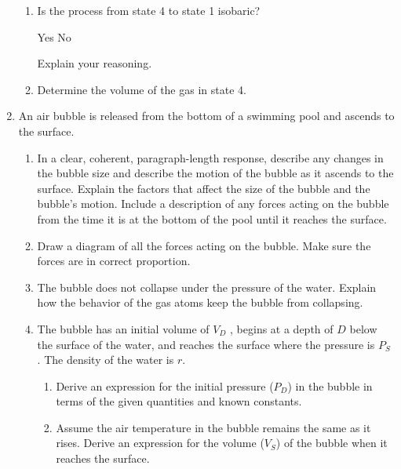 \documentclass{../../../oss-apphys}
\begin{document}
\begin{enumerate}[leftmargin=15pt]
\begin{enumerate}[leftmargin=18pt]
  \item Is the process from state 4 to state 1 isobaric?

    \vspace{.1in}\underline{\hspace{.3in}}Yes\hspace{.5in}
    \underline{\hspace{.3in}} No

    \vspace{.1in}Explain your reasoning.\vspace{.35in}

  \item Determine the volume of the gas in state 4.
    \vspace{1.25in}
  \end{enumerate}
  
\item An air bubble is released from the bottom of a swimming pool and ascends
  to the surface.
  \begin{enumerate}[leftmargin=18pt]
  \item In a clear, coherent, paragraph-length response, describe any
    changes in the bubble size and describe the motion of the bubble
    as it ascends to the surface. Explain the factors that affect the size
    of the bubble and the bubble's motion. Include a description of
    any forces acting on the bubble from the time it is at the bottom of
    the pool until it reaches the surface.
    \vspace{1.75in}
    
  \item Draw a diagram of all the forces acting on the bubble. Make sure
    the forces are in correct proportion.
    \vspace{1.75in}

  \item The bubble does not collapse under the pressure of the water.
    Explain how the behavior of the gas atoms keep the bubble from
    collapsing.
    \newpage
    
  \item The bubble has an initial volume of $V_D$ , begins at a depth of $D$
    below the surface of the water, and reaches the surface where the
    pressure is $P_S$ . The density of the water is $r$.
    \begin{enumerate}
    \item  Derive an expression for the initial pressure ($P_D$) in the bubble
      in terms of the given quantities and known constants.
    \item Assume the air temperature in the bubble remains the same as
      it rises. Derive an expression for the volume ($V_S$) of the bubble
      when it reaches the surface.
    \end{enumerate}
    \vspace{2in}
    

\end{enumerate}
\end{enumerate}
\end{document}
